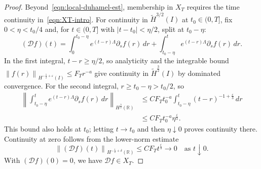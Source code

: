 \documentclass[11pt,reqno]{amsart}
\theoremstyle{plain}
\theoremstyle{definition}
\numberwithin{equation}{section}
\newcommand{\p}{\partial}
\newcommand{\mc}[1]{\mathcal{#1}}
\newcommand{\wt}[1]{\widetilde{#1}}
\newcommand{\abs}[1]{\left\lvert #1 \right\rvert}
\newcommand{\norm}[1]{\left\lVert #1 \right\rVert}
\newcommand{\R}{\mathbb{R}}
\newcommand{\hi}[1]{H^{#1}(I)}
\newcommand{\thi}[1]{\wt H^{#1}(I)}
\newcommand{\hr}[1]{H^{#1}(\R)}
\begin{document}
\begin{proof}
Beyond~\eqref{eqn:local-duhamel-est}, membership in $X_T$ requires the
time continuity in~\eqref{eqn:XT-intro}. For continuity in $\thi{3/2}$
at $t_0\in(0,T]$, fix $0<\eta<t_0/4$ and, for $t\in(0,T]$ with
$\abs{t-t_0}<\eta/2$, split at $t_0-\eta$:
\begin{equation*}
    (\mc Df)(t)
    =\int_0^{t_0-\eta}e^{(t-r)\Lambda}\p_s f(r)\,dr
    +\int_{t_0-\eta}^t e^{(t-r)\Lambda}\p_s f(r)\,dr.
\end{equation*}
In the first integral, $t-r\ge\eta/2$, so analyticity and the integrable
bound $\norm{f(r)}_{\hi{-\frac12+\varepsilon}}\le F_T r^{-a}$ give
continuity in $\thi{\frac32}$ by dominated convergence.
For the second integral, $r\ge t_0-\eta>t_0/2$, so
\begin{equation*}
\begin{aligned}
    \norm{\int_{t_0-\eta}^t e^{(t-r)\Lambda}\p_s f(r)\,dr}_{\hr{\frac32}}
    &\le C F_T t_0^{-a}
    \int_{t_0-\eta}^t(t-r)^{-1+\frac{\varepsilon}{3}}\,dr\\
    &\le C F_T t_0^{-a}\eta^{\frac{\varepsilon}{3}}.
\end{aligned}
\end{equation*}
This bound also holds at $t_0$; letting $t\to t_0$ and then
$\eta\downarrow0$ proves continuity there.
Continuity at zero follows from the lower-norm estimate
\begin{equation*}
    \norm{(\mc Df)(t)}_{\hr{-\frac12+\delta}}
    \le C F_T t^{\frac{\varepsilon}{3}}\longrightarrow0
    \quad\text{as }t\downarrow0.
\end{equation*}
With $(\mc Df)(0)=0$, we have $\mc Df\in X_T$.


\end{proof}
\end{document}
